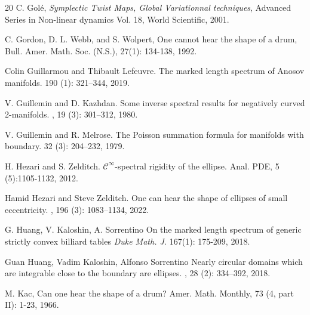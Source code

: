 \documentclass[12pt, openany]{amsart}
\theoremstyle{definition}
\theoremstyle{remark}
\theoremstyle{remark}
\theoremstyle{theorem}
\theoremstyle{theorem}
\theoremstyle{theorem}
\theoremstyle{theorem}
\begin{document}
\begin{thebibliography}{20}
C. Gol\'e, \textit{Symplectic Twist Maps, Global Variationnal techniques}, Advanced Series in Non-linear dynamics Vol. 18, World Scientific, 2001.

C. Gordon, D. L. Webb, and S. Wolpert, One cannot hear the shape of a drum, Bull. Amer. Math. Soc. (N.S.), 27(1): 134-138, 1992.


Colin Guillarmou and Thibault Lefeuvre.
\newblock The marked length spectrum of Anosov manifolds.
 190 (1): 321--344, 2019.


V. Guillemin and D. Kazhdan. 
\newblock Some inverse spectral results for negatively curved 2-manifolds. 
, 19 (3): 301--312, 1980.


V. Guillemin and R. Melrose.
\newblock The Poisson summation formula for manifolds with boundary. 
 32 (3): 204--232, 1979.


H. Hezari and S. Zelditch. $\mathscr C^{\infty}$-spectral rigidity of the ellipse. Anal. PDE, 5 (5):1105-1132, 2012.


Hamid Hezari and Steve Zelditch.
\newblock One can hear the shape of ellipses of small eccentricity.
, 196 (3): 1083--1134, 2022.



G. Huang, V. Kaloshin, A. Sorrentino
\newblock On the marked length spectrum of generic strictly convex billiard tables
\newblock \textit{Duke Math. J.} 167(1): 175-209, 2018.

Guan Huang, Vadim Kaloshin, Alfonso Sorrentino
\newblock Nearly circular domains which are integrable close to the boundary are ellipses. 
,  28 (2): 334--392, 2018.


M. Kac, Can one hear the shape of a drum? Amer. Math. Monthly, 73 (4, part II): 1-23, 1966.




\end{thebibliography}
\end{document}
